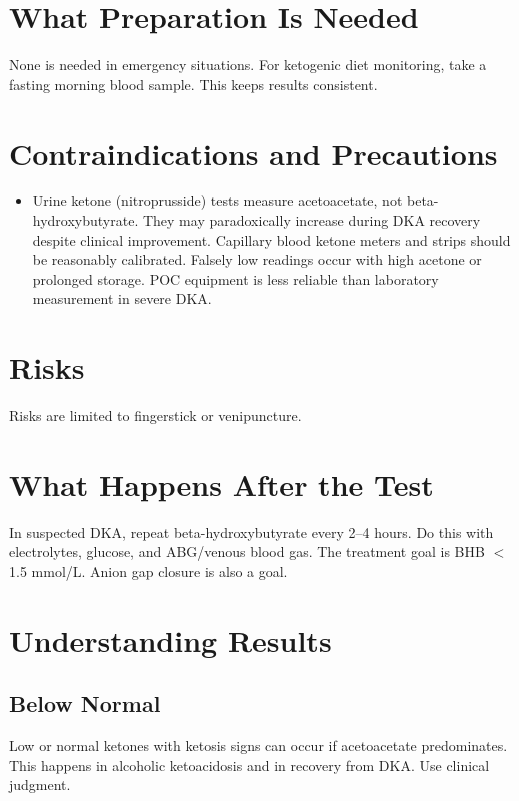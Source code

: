 \section*{What Preparation Is Needed}
None is needed in emergency situations. For ketogenic diet monitoring, take a fasting morning blood sample. This keeps results consistent.

\section*{Contraindications and Precautions}
\begin{itemize}
  \item Urine ketone (nitroprusside) tests measure acetoacetate, not beta-hydroxybutyrate. They may paradoxically increase during DKA recovery despite clinical improvement. Capillary blood ketone meters and strips should be reasonably calibrated. Falsely low readings occur with high acetone or prolonged storage. POC equipment is less reliable than laboratory measurement in severe DKA.
\end{itemize}
\section*{Risks}
Risks are limited to fingerstick or venipuncture.

\section*{What Happens After the Test}
In suspected DKA, repeat beta-hydroxybutyrate every 2--4 hours. Do this with electrolytes, glucose, and ABG/venous blood gas. The treatment goal is BHB $<$ 1.5 mmol/L. Anion gap closure is also a goal.

\section*{Understanding Results}

\subsection*{Below Normal}
Low or normal ketones with ketosis signs can occur if acetoacetate predominates. This happens in alcoholic ketoacidosis and in recovery from DKA. Use clinical judgment.

